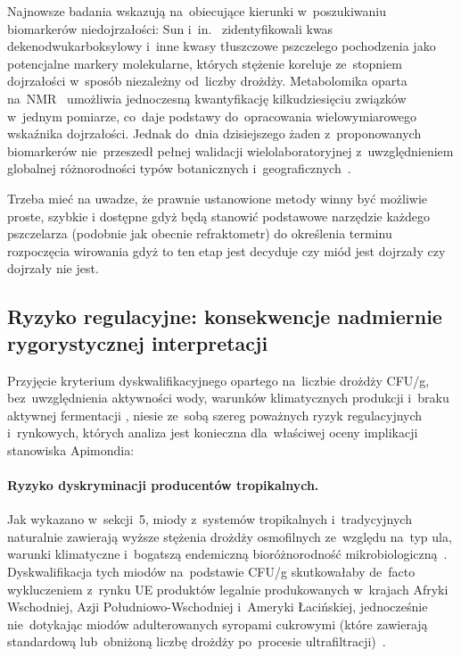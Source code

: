 Najnowsze badania wskazują na~obiecujące kierunki
w~poszukiwaniu biomarkerów niedojrzałości: Sun i~in.~\cite{sun2021}
zidentyfikowali kwas dekenodwukarboksylowy i~inne kwasy
tłuszczowe pszczelego pochodzenia jako potencjalne markery
molekularne, których stężenie koreluje ze~stopniem dojrzałości
w~sposób niezależny od~liczby drożdży. Metabolomika
oparta na~NMR~\cite{nmrhoney2023} umożliwia jednoczesną
kwantyfikację kilkudziesięciu związków w~jednym pomiarze,
co~daje podstawy do~opracowania wielowymiarowego wskaźnika
dojrzałości. Jednak do~dnia dzisiejszego żaden z~proponowanych
biomarkerów nie~przeszedł pełnej walidacji wielolaboratoryjnej
z~uwzględnieniem globalnej różnorodności typów botanicznych
i~geograficznych~\cite{tsagkaris2021}.

Trzeba mieć na uwadze, że prawnie ustanowione metody winny być możliwie proste, szybkie i dostępne gdyż będą stanowić podstawowe narzędzie każdego pszczelarza (podobnie jak obecnie refraktometr) do określenia terminu rozpoczęcia wirowania gdyż to ten etap jest decyduje czy miód jest dojrzały czy dojrzały nie jest.  

\subsection{Ryzyko regulacyjne: konsekwencje nadmiernie rygorystycznej interpretacji}

Przyjęcie kryterium dyskwalifikacyjnego opartego na~liczbie
drożdży CFU/g, bez~uwzględnienia aktywności wody,
warunków klimatycznych produkcji i~braku aktywnej fermentacji
, niesie ze~sobą szereg poważnych ryzyk regulacyjnych
i~rynkowych, których analiza jest konieczna dla~właściwej
oceny implikacji stanowiska Apimondia:

\paragraph{Ryzyko dyskryminacji producentów tropikalnych.}
Jak wykazano w~sekcji~5, miody z~systemów tropikalnych
i~tradycyjnych naturalnie zawierają wyższe stężenia
drożdży osmofilnych ze~względu na~typ ula, warunki
klimatyczne i~bogatszą endemiczną bioróżnorodność
mikrobiologiczną~\cite{tadele2025,stinglessyeastbrazil2021}.
Dyskwalifikacja tych miodów na~podstawie CFU/g
skutkowałaby de~facto wykluczeniem z~rynku UE produktów
legalnie produkowanych w~krajach Afryki Wschodniej,
Azji Południowo-Wschodniej i~Ameryki Łacińskiej,
jednocześnie nie~dotykając miodów adulterowanych
syropami cukrowymi (które zawierają standardową
lub~obniżoną liczbę drożdży po~procesie
ultrafiltracji)~\cite{eufromhives2021}.

